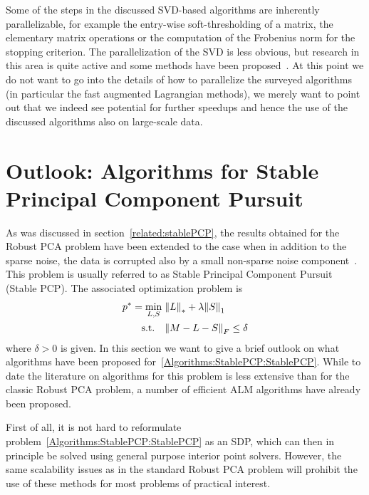 Some of the steps in the discussed SVD-based algorithms are inherently parallelizable, for example the entry-wise soft-thresholding of a matrix, the elementary matrix operations or the computation of the Frobenius norm for the stopping criterion. The parallelization of the SVD is less obvious, but research in this area is quite active and some methods have been proposed~\cite{Berry:2005uq}. At this point we do not want to go into the details of how to parallelize the surveyed algorithms (in particular the fast augmented Lagrangian methods), we merely want to point out that we indeed see potential for further speedups and hence the use of the discussed algorithms also on large-scale data.
%
%



\section{Outlook: Algorithms for Stable Principal Component Pursuit}
\label{Algorithms:StablePCP:Sec}

As was discussed in section~\ref{related:stablePCP}, the results obtained for the Robust PCA problem have been extended to the case when in addition to the sparse noise, the data is corrupted also by a small non-sparse noise component~\cite{Zhou:2010vn}. This problem is usually referred to as Stable Principal Component Pursuit (Stable PCP). The associated optimization problem is 
%
\begin{align}
\begin{split}
p^* = \min_{L,S} \; &{\left\|L\right\|}_{*}^{} + \lambda {\left\|S\right\|}_{1}^{} \\
\text{s.t.} \quad &{\left\|M - L - S\right\|}_{F}^{} \leq \delta
\end{split}
\label{Algorithms:StablePCP:StablePCP}
\end{align}
%
where $\delta>0$ is given. In this section we want to give a brief outlook on what algorithms have been proposed for~\eqref{Algorithms:StablePCP:StablePCP}. While to date the literature on algorithms for this problem is less extensive than for the classic Robust PCA problem, a number of efficient ALM algorithms have already been proposed. 

First of all, it is not hard to reformulate problem~\eqref{Algorithms:StablePCP:StablePCP} as an SDP, which can then in principle be solved using general purpose interior point solvers. However, the same scalability issues as in the standard Robust PCA problem will prohibit the use of these methods for most problems of practical interest.

